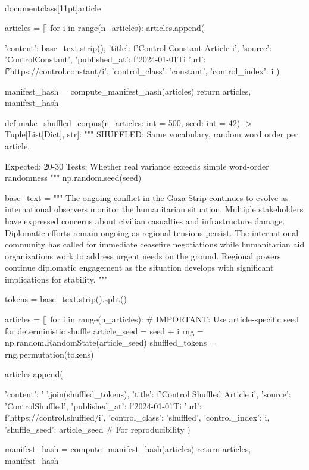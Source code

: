 \\documentclass[11pt]{article}
\begin{document}
\begin{CodeBlock}
    articles = []
    for i in range(n_articles):
        articles.append({
            'content': base_text.strip(),
            'title': f'Control Constant Article {i}',
            'source': 'ControlConstant',
            'published_at': f'2024-01-01T{i%
            'url': f'https://control.constant/{i}',
            'control_class': 'constant',
            'control_index': i
        })
    
    manifest_hash = compute_manifest_hash(articles)
    return articles, manifest_hash


def make_shuffled_corpus(n_articles: int = 500, seed: int = 42) -> Tuple[List[Dict], str]:
    """
    SHUFFLED: Same vocabulary, random word order per article.
    
    Expected: 20-30%
    Tests: Whether real variance exceeds simple word-order randomness
    """
    np.random.seed(seed)
    
    base_text = """
    The ongoing conflict in the Gaza Strip continues to evolve as international 
    observers monitor the humanitarian situation. Multiple stakeholders have 
    expressed concerns about civilian casualties and infrastructure damage. 
    Diplomatic efforts remain ongoing as regional tensions persist. The 
    international community has called for immediate ceasefire negotiations 
    while humanitarian aid organizations work to address urgent needs on the 
    ground. Regional powers continue diplomatic engagement as the situation 
    develops with significant implications for stability.
    """
    
    tokens = base_text.strip().split()
    
    articles = []
    for i in range(n_articles):
        # IMPORTANT: Use article-specific seed for deterministic shuffle
        article_seed = seed + i
        rng = np.random.RandomState(article_seed)
        shuffled_tokens = rng.permutation(tokens)
        
        articles.append({
            'content': ' '.join(shuffled_tokens),
            'title': f'Control Shuffled Article {i}',
            'source': 'ControlShuffled',
            'published_at': f'2024-01-01T{i%
            'url': f'https://control.shuffled/{i}',
            'control_class': 'shuffled',
            'control_index': i,
            'shuffle_seed': article_seed  # For reproducibility
        })
    
    manifest_hash = compute_manifest_hash(articles)
    return articles, manifest_hash


}}
\end{CodeBlock}
\end{document}
